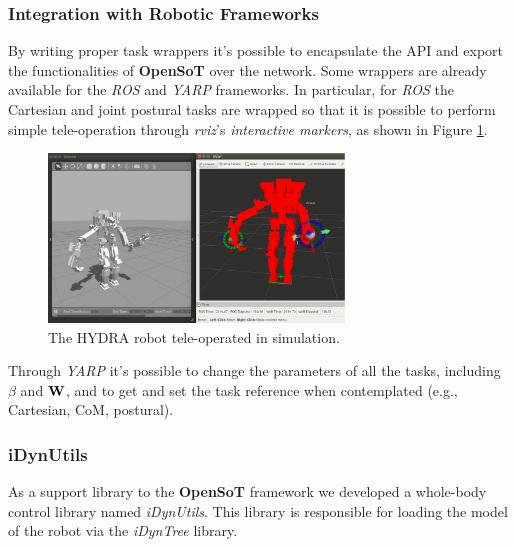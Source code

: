 \subsubsection{Integration with Robotic Frameworks}
\label{sec:integration_with_robotic_frameworks}
By writing proper task wrappers it's possible to encapsulate the API and export the functionalities of \textbf{OpenSoT} over the network. Some wrappers are already available for the \emph{ROS} and \emph{YARP} frameworks. In particular, for \emph{ROS} the Cartesian and joint postural tasks are wrapped so that it is possible to perform simple tele-operation  through \emph{rviz}'s \emph{interactive markers}, as shown in Figure \ref{opensot_interactive_markers}.
\begin{figure}[!ht]
\vspace{2 mm}
\centering
\includegraphics[width=0.7\textwidth]{images/software/hydra_tele_operation.eps}
\caption{The HYDRA robot tele-operated in simulation.}
\label{opensot_interactive_markers}
\end{figure}
Through \emph{YARP} it's possible to change the parameters of all the tasks, including $\beta$ and $\mathbf{W}$, and to get and set the task reference when contemplated (e.g., Cartesian, CoM, postural).

\subsubsection{iDynUtils}
\label{sec:idynutils}

As a support library to the \textbf{OpenSoT} framework we developed a whole-body control library named \emph{iDynUtils}.
This library is responsible for loading the model of the robot via the \emph{iDynTree}\cite{Nori2015-zb,Nori2015-db} library.

